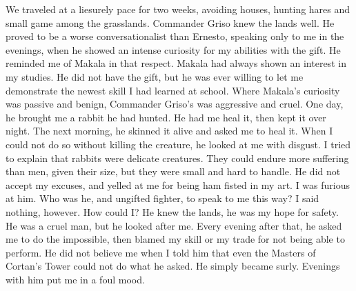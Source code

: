 \documentclass{article}
\begin{document}
We traveled at a liesurely pace for two weeks, avoiding houses, hunting hares and small game among the grasslands. Commander Griso knew the lands well. He proved to be a worse conversationalist than Ernesto, speaking only to me in the evenings, when he showed an intense curiosity for my abilities with the gift. He reminded me of Makala in that respect. Makala had always shown an interest in my studies. He did not have the gift, but he was ever willing to let me demonstrate the newest skill I had learned at school. Where Makala's curiosity was passive and benign, Commander Griso's was aggressive and cruel. One day, he brought me a rabbit he had hunted. He had me heal it, then kept it over night. The next morning, he skinned it alive and asked me to heal it. When I could not do so without killing the creature, he looked at me with disgust. I tried to explain that rabbits were delicate creatures. They could endure more suffering than men, given their size, but they were small and hard to handle. He did not accept my excuses, and yelled at me for being ham fisted in my art. I was furious at him. Who was he, and ungifted fighter, to speak to me this way? I said nothing, however. How could I? He knew the lands, he was my hope for safety. He was a cruel man, but he looked after me. Every evening after that, he asked me to do the impossible, then blamed my skill or my trade for not being able to perform. He did not believe me when I told him that even the Masters of Cortan's Tower could not do what he asked. He simply became surly. Evenings with him put me in a foul mood. 
\end{document}
